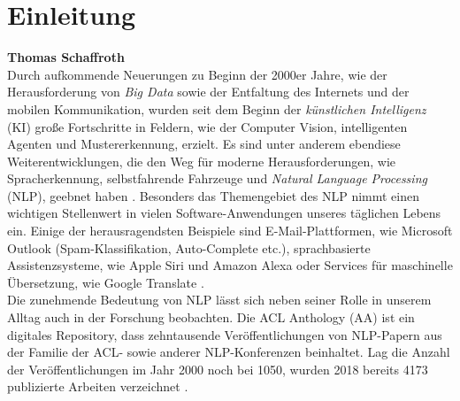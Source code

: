 \documentclass[bachelor,german]{info1thesis}
\begin{document}
\chapter{Einleitung}
\textbf{Thomas Schaffroth} \\
Durch aufkommende Neuerungen zu Beginn der 2000er Jahre, wie der Herausforderung von \textit{Big Data} sowie der Entfaltung des Internets und der mobilen Kommunikation, wurden seit dem Beginn der \textit{künstlichen Intelligenz} (KI) große Fortschritte in Feldern, wie der Computer Vision, intelligenten Agenten und Mustererkennung, erzielt. Es sind unter anderem ebendiese Weiterentwicklungen, die den Weg für moderne Herausforderungen, wie Spracherkennung, selbstfahrende Fahrzeuge und \textit{Natural Language Processing} (NLP), geebnet haben \cite{Perez2018}.
Besonders das Themengebiet des NLP nimmt einen wichtigen Stellenwert in vielen Software-Anwendungen unseres täglichen Lebens ein. Einige der herausragendsten Beispiele sind E-Mail-Plattformen, wie Microsoft Outlook (Spam-Klassifikation, Auto-Complete etc.), sprachbasierte Assistenzsysteme, wie Apple Siri und Amazon Alexa oder Services für maschinelle Übersetzung, wie Google Translate \cite{Vajjala2020}. \\
Die zunehmende Bedeutung von NLP lässt sich neben seiner Rolle in unserem Alltag auch in der Forschung beobachten. Die ACL Anthology (AA) ist ein digitales Repository, dass zehntausende Veröffentlichungen von NLP-Papern aus der Familie der ACL- sowie anderer NLP-Konferenzen beinhaltet. Lag die Anzahl der Veröffentlichungen im Jahr 2000 noch bei 1050, wurden 2018 bereits 4173 publizierte Arbeiten verzeichnet \cite{Mohammad2019}. \\
\end{document}
